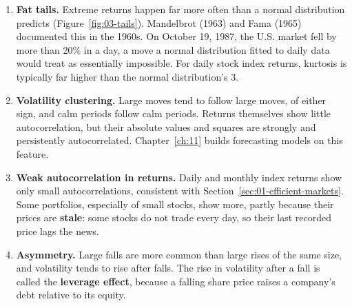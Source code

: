 \begin{enumerate}
  \item \textbf{Fat tails.} Extreme returns happen far more often than a normal distribution predicts (Figure~\ref{fig:03-tails}). Mandelbrot (1963) and Fama (1965) documented this in the 1960s. On October 19, 1987, the U.S. market fell by more than 20\% in a day, a move a normal distribution fitted to daily data would treat as essentially impossible. For daily stock index returns, kurtosis is typically far higher than the normal distribution's 3.
  \item \textbf{Volatility clustering.} Large moves tend to follow large moves, of either sign, and calm periods follow calm periods. Returns themselves show little autocorrelation, but their absolute values and squares are strongly and persistently autocorrelated. Chapter~\ref{ch:11} builds forecasting models on this feature.
  \item \textbf{Weak autocorrelation in returns.} Daily and monthly index returns show only small autocorrelations, consistent with Section~\ref{sec:01-efficient-markets}. Some portfolios, especially of small stocks, show more, partly because their prices are \textbf{stale}: some stocks do not trade every day, so their last recorded price lags the news.
  \item \textbf{Asymmetry.} Large falls are more common than large rises of the same size, and volatility tends to rise after falls. The rise in volatility after a fall is called the \textbf{leverage effect}, because a falling share price raises a company's debt relative to its equity.
\end{enumerate}




